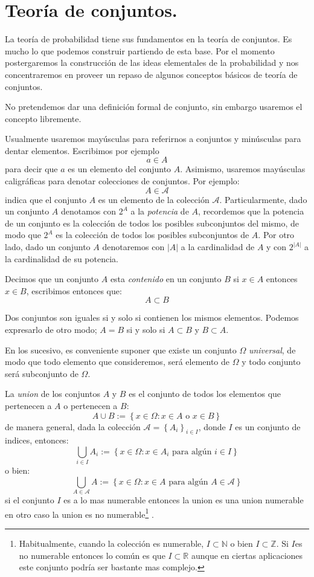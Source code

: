 \documentclass[14pt]{extreport}
\begin{document}
\chapter{Teoría de conjuntos.}

La teoría de probabilidad tiene sus fundamentos en la teoría de conjuntos. Es mucho lo que podemos construir partiendo de esta base. Por el momento postergaremos la construcción de las ideas elementales de la probabilidad y nos concentraremos en proveer un repaso de algunos conceptos básicos de teoría de conjuntos.

No pretendemos dar una definición formal de conjunto, sin embargo usaremos el concepto libremente. 


Usualmente usaremos mayúsculas para referirnos a conjuntos y minúsculas para dentar elementos. Escribimos por ejemplo
$$
a \in A 
$$
para decir que $a$ es un elemento del conjunto $A$. Asimismo, usaremos mayúsculas caligráficas para denotar colecciones de conjuntos. Por ejemplo:
$$
A\in \mathcal{A}
$$
indica que el conjunto $A$ es un elemento de la colección $\mathcal{A}$.
Particularmente, dado un conjunto $A$ denotamos con $2^A$ a la \emph{potencia} de $A$, recordemos que la potencia de un conjunto es la colección de todos los posibles subconjuntos del mismo, de modo que $2^A$ es la colección de todos los posibles subconjuntos de $A$. Por otro lado, dado un conjunto $A$ denotaremos con $\vert A \vert$ a la cardinalidad de $A$ y con $2^{\vert A \vert}$ a la cardinalidad de su potencia.


Decimos que un conjunto $A$ esta \emph{contenido} en un conjunto $B$ si $x\in A$ entonces $x \in B$, escribimos entonces que:
$$
A\subset B
$$

Dos conjuntos son iguales si y solo si contienen los mismos elementos. Podemos expresarlo de otro modo; $A = B$ si y solo si $A\subset B$ y $B \subset A$.

En los sucesivo, es conveniente suponer que existe un conjunto $\Omega$ \emph{universal}, de modo que todo elemento que consideremos, será elemento de $\Omega$ y todo conjunto será subconjunto de $\Omega$.

La \emph{union} de los conjuntos $A$ y $B$ es el conjunto de todos los elementos que pertenecen a $A$ o pertenecen a $B$:
$$
A\cup B := \left\{x \in \Omega: x \in A \text{ o } x \in B\right\}
$$
de manera general, dada la colección $\mathcal{A} = \left\{A_i\right\}_{i\in I}$, donde $I$ es un conjunto de indices, entonces:
$$
\bigcup_{i\in I}A_i := \left\{x \in \Omega: x \in A_i \text{ para algún } i\in I \right\}
$$
\noindent
o bien:
\noindent
$$
\bigcup_{A\in \mathcal{A}}A := \left\{x\in \Omega: x \in A \text{ para algún } A\in \mathcal{A} \right\}
$$
si el conjunto $I$ es a lo mas numerable entonces la union es una union numerable en otro caso la union es no numerable\footnote{Habitualmente, cuando la colección es numerable, $I\subset \mathbb{N}$ o bien $I\subset \mathbb{Z}$. Si $I$es no numerable entonces lo común es que $I\subset\mathbb{R}$ aunque en ciertas aplicaciones este conjunto podría ser bastante mas complejo.} . 
\end{document}
